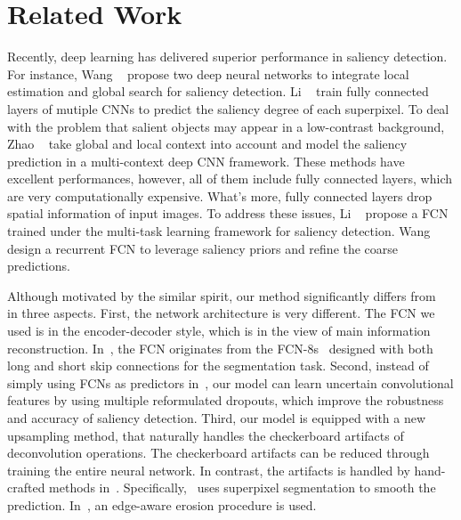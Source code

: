 \documentclass[10pt,twocolumn,letterpaper]{article}
\begin{document}
\section{Related Work}
Recently, deep learning has delivered superior performance in saliency detection.
For instance, Wang \etal~\cite{wang2015deep} propose two deep neural networks to integrate local estimation and global search for saliency detection.
Li \etal~\cite{li2015visual} train fully connected layers of mutiple CNNs to predict the saliency degree of each superpixel.
To deal with the problem that salient objects may appear in a low-contrast background, Zhao \etal~\cite{zhao2015saliency} take global and local context into account and  model the saliency prediction in a multi-context deep CNN framework.
These methods have excellent performances, however, all of them include fully connected layers, which are very computationally expensive.
What's more, fully connected layers drop spatial information of input images.
To address these issues, Li \etal~\cite{Li2016DeepSaliency} propose a FCN trained under the multi-task learning framework for saliency detection.
Wang \etal~\cite{wang2016saliency} design a recurrent FCN to leverage saliency priors and refine the coarse predictions.


Although motivated by the similar spirit, our method significantly differs from~\cite{Li2016DeepSaliency,wang2016saliency} in three aspects.
First, the network architecture is very different. The FCN we used is in the encoder-decoder style, which is in the view of main information reconstruction. In~\cite{Li2016DeepSaliency,wang2016saliency}, the FCN originates from the FCN-8s~\cite{long2015fully} designed with both long and short skip connections for the segmentation task.
Second, instead of simply using FCNs as predictors in~\cite{Li2016DeepSaliency,wang2016saliency}, our model can learn uncertain convolutional features by using multiple reformulated dropouts, which improve the robustness and accuracy of saliency detection.
Third, our model is equipped with a new upsampling method, that naturally handles the checkerboard artifacts of deconvolution operations.
The checkerboard artifacts can be reduced through training the entire neural network.
In contrast, the artifacts is handled by hand-crafted methods in~\cite{Li2016DeepSaliency,wang2016saliency}.
Specifically,~\cite{Li2016DeepSaliency} uses superpixel segmentation to smooth the prediction. In~\cite{wang2016saliency}, an edge-aware erosion procedure is used.
\end{document}
